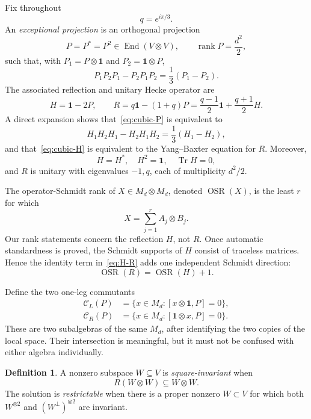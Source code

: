 \documentclass[11pt]{article}
\theoremstyle{definition}
\newtheorem{definition}[theorem]{Definition}
\theoremstyle{remark}
\newcommand{\Id}{\mathbf 1}
\newcommand{\Tr}{\operatorname{Tr}}
\newcommand{\End}{\operatorname{End}}
\newcommand{\rank}{\operatorname{rank}}
\newcommand{\OSR}{\operatorname{OSR}}
\newcommand{\cC}{\mathcal C}
\begin{document}
Fix throughout
\[
  q=e^{i\pi/3}.
\]
An \emph{exceptional projection} is an orthogonal projection
\[
  P=P^*=P^2\in\End(V\otimes V),\qquad
  \rank P=\frac{d^2}{2},
\]
such that, with \(P_1=P\otimes\Id\) and \(P_2=\Id\otimes P\),
\begin{equation}
  P_1P_2P_1-P_2P_1P_2=\frac13(P_1-P_2).
  \label{eq:cubic-P}
\end{equation}
The associated reflection and unitary Hecke operator are
\begin{equation}
  H=\Id-2P,\qquad
  R=q\Id-(1+q)P
   =\frac{q-1}{2}\Id+\frac{q+1}{2}H.
  \label{eq:H-R}
\end{equation}
A direct expansion shows that~\eqref{eq:cubic-P} is equivalent to
\begin{equation}
  H_1H_2H_1-H_2H_1H_2=\frac13(H_1-H_2),
  \label{eq:cubic-H}
\end{equation}
and that~\eqref{eq:cubic-H} is equivalent to the Yang--Baxter equation
for \(R\). Moreover,
\[
  H=H^*,\quad H^2=\Id,\quad\Tr H=0,
\]
and \(R\) is unitary with eigenvalues \(-1,q\), each of multiplicity
\(d^2/2\).

The operator-Schmidt rank of \(X\in M_d\otimes M_d\), denoted
\(\OSR(X)\), is the least \(r\) for which
\[
  X=\sum_{j=1}^r A_j\otimes B_j.
\]
Our rank statements concern the reflection \(H\), not \(R\). Once
automatic standardness is proved, the Schmidt supports of \(H\) consist of
traceless matrices. Hence the identity term in~\eqref{eq:H-R} adds one
independent Schmidt direction:
\begin{equation}
  \OSR(R)=\OSR(H)+1.
  \label{eq:osr-shift}
\end{equation}

Define the two one-leg commutants
\begin{equation}
\begin{split}
  \cC_L(P)&=\{x\in M_d:[x\otimes\Id,P]=0\},\\
  \cC_R(P)&=\{x\in M_d:[\Id\otimes x,P]=0\}.
\end{split}
\label{eq:leg-commutants}
\end{equation}
These are two subalgebras of the same \(M_d\), after identifying the two
copies of the local space. Their intersection is meaningful, but it must
not be confused with either algebra individually.

\begin{definition}\label{def:restrictable}
A nonzero subspace \(W\subseteq V\) is \emph{square-invariant} when
\[
  R(W\otimes W)\subseteq W\otimes W.
\]
The solution is \emph{restrictable} when there is a proper nonzero
\(W\subset V\) for which both \(W^{\otimes2}\) and
\((W^\perp)^{\otimes2}\) are invariant.
\end{definition}
\end{document}
